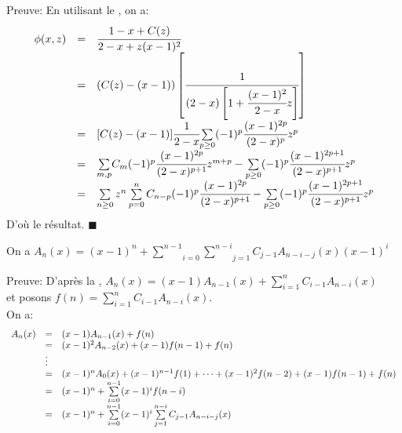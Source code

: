 Preuve:
En utilisant le , on a:\\
\[
	\begin{array}{r c l}
		\phi(x,z) & = & \cfrac{1-x+C(z)}{2-x+z(x-1)^{2}}                                                                                                                                    \\
		          & = & (C(z)-(x-1))\left[\cfrac{1}{(2-x)\left[1+\cfrac{(x-1)^2}{2-x}z\right]}\right]                                                                                       \\
		          & = & [C(z)-(x-1)]\cfrac{1}{2-x}\underset{p\geq0}{\sum}(-1)^p\cfrac{(x-1)^{2p}}{(2-x)^p}z^p                                                                               \\
		          & = & \underset{m,p}{\sum}C_{m}(-1)^p\cfrac{(x-1)^{2p}}{(2-x)^{p+1}}z^{m+p}-\underset{p\geq0}{\sum}(-1)^p\cfrac{(x-1)^{2p+1}}{(2-x)^{p+1}}z^p                             \\
		          & = & \sum\limits_{n\geq 0}z^{n} \sum\limits_{p=0}^{n} C_{n-p}(-1)^{p}\cfrac{(x-1)^{2p}}{(2-x)^{p+1}} - \underset{p\geq0}{\sum}(-1)^p\cfrac{(x-1)^{2p+1}}{(2-x)^{p+1}}z^p \\
	\end{array}
\]
D'où le résultat. \vspace{10pt}$\blacksquare$
\begin{proposition}\label{p1}
	On a
	$A_{n}(x)=(x-1)^{n}+\underset{i=0}{\overset{n-1}{\sum}}\underset{j=1}{\overset{n-i}{\sum}}C_{j-1}A_{n-i-j}(x)(x-1)^{i}$
\end{proposition}
Preuve: D'après la , $A_{n}(x)=(x-1)A_{n-1}(x)+ \sum\limits_{i=1}^{n}C_{i-1}A_{n-i}(x)$\\ et posons $f(n) = \sum\limits_{i=1}^{n}C_{i-1}A_{n-i}(x)$. \\
On a:
\[
	\begin{array}{l l l}
		A_{n}(x) & =      & (x-1)A_{n-1}(x) + f(n)                                                                  \\
		         & =      & (x-1)^{2}A_{n-2}(x) + (x-1)f(n-1) + f(n)                                                \\
		         & \vdots &                                                                                         \\
		         & =      & (x-1)^{n}A_{0}(x) + (x-1)^{n-1}f(1) + \cdots + (x-1)^{2}f(n-2) + (x-1)f(n-1) + f(n)     \\
		         & =      & (x-1)^{n} + \sum\limits_{i=0}^{n-1}(x-1)^{i}f(n-i)                                      \\
		         & =      & (x-1)^{n} + \sum\limits_{i=0}^{n-1}(x-1)^{i} \sum\limits_{j=1}^{n-i}C_{j-1}A_{n-i-j}(x)
	\end{array}
\]
